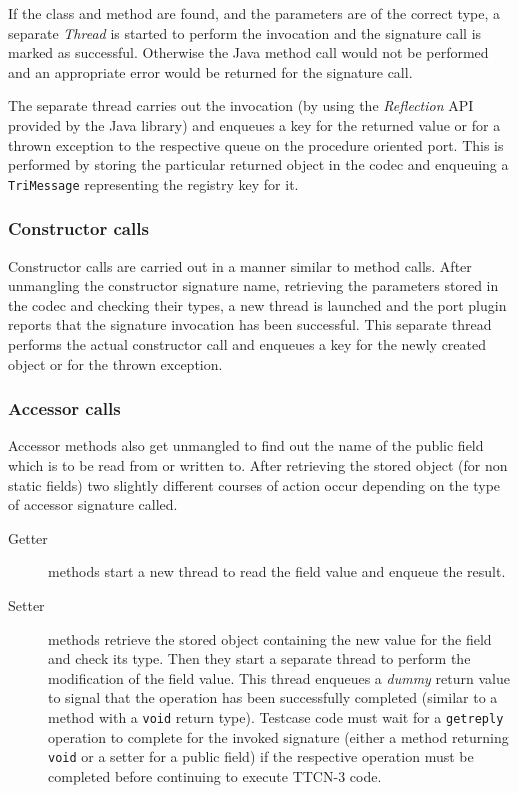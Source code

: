 If the class and method are found, and the parameters are of the correct type,
a separate \emph{Thread} is started to perform the invocation
and the signature call is marked as successful.
Otherwise the Java method call would not be performed
and an appropriate error would be returned for the signature call.

The separate thread carries out the invocation
(by using the \emph{Reflection} \ac{API} provided by the Java library)
and enqueues a key for the returned value or for a thrown exception
to the respective queue on the procedure oriented port.
This is performed by storing the particular returned object in the codec
and enqueuing a \verb=TriMessage= representing the registry key for it.


\subsubsection{Constructor calls}

Constructor calls are carried out in a manner similar to method calls.
After unmangling the constructor signature name,
retrieving the parameters stored in the codec and checking their types,
a new thread is launched
and the port plugin reports that the signature invocation has been successful.
This separate thread performs the actual constructor call
and enqueues a key for the newly created object or for the thrown exception.


\subsubsection{Accessor calls}

Accessor methods also get unmangled to find out the name of the public field
which is to be read from or written to.
After retrieving the stored object (for non static fields)
two slightly different courses of action occur depending on
the type of accessor signature called.
\begin{description}
\item[Getter] methods start a new thread to read the field value
and enqueue the result.
\item[Setter] methods retrieve the stored object containing the new value
for the field and check its type.
Then they start a separate thread
to perform the modification of the field value.
This thread enqueues a \emph{dummy} return value
to signal that the operation has been successfully completed
(similar to a method with a \verb=void= return type).
Testcase code must wait for a \verb=getreply= operation to complete
for the invoked signature
(either a method returning \verb=void= or a setter for a public field)
if the respective operation must be completed
before continuing to execute \ac{TTCN-3} code.
\end{description}


